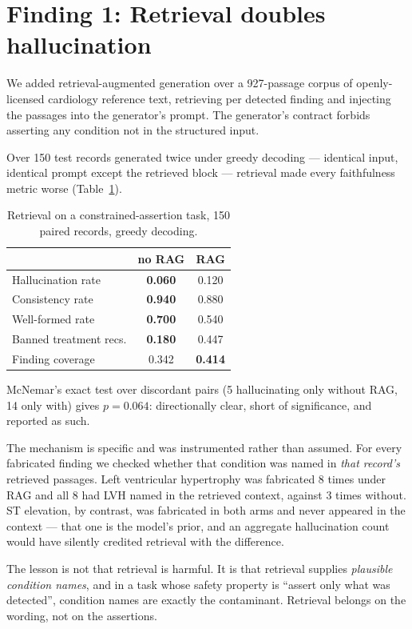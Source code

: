 \documentclass[pmlr,twocolumn,10pt]{jmlr}
\begin{document}
\section{Finding 1: Retrieval doubles hallucination}
\label{sec:rag}

We added retrieval-augmented generation \citep{lewis2020retrieval} over a 927-passage corpus
of openly-licensed cardiology reference text, retrieving per detected finding and injecting
the passages into the generator's prompt. The generator's contract forbids asserting any
condition not in the structured input.

Over 150 test records generated twice under greedy decoding --- identical input, identical
prompt except the retrieved block --- retrieval made every faithfulness metric worse
(Table~\ref{tab:rag}).

\begin{table}[t]
\centering
\caption{Retrieval on a constrained-assertion task, 150 paired records, greedy decoding.}
\label{tab:rag}
\begin{tabular}{lcc}
\toprule
 & no RAG & RAG \\
\midrule
Hallucination rate     & \textbf{0.060} & 0.120 \\
Consistency rate       & \textbf{0.940} & 0.880 \\
Well-formed rate       & \textbf{0.700} & 0.540 \\
Banned treatment recs. & \textbf{0.180} & 0.447 \\
Finding coverage       & 0.342 & \textbf{0.414} \\
\bottomrule
\end{tabular}
\end{table}

McNemar's exact test over discordant pairs (5 hallucinating only without RAG, 14 only with)
gives $p = 0.064$: directionally clear, short of significance, and reported as such.

The mechanism is specific and was instrumented rather than assumed. For every fabricated
finding we checked whether that condition was named in \emph{that record's} retrieved
passages. Left ventricular hypertrophy was fabricated 8 times under RAG and all 8 had LVH
named in the retrieved context, against 3 times without. ST elevation, by contrast, was
fabricated in both arms and never appeared in the context --- that one is the model's prior,
and an aggregate hallucination count would have silently credited retrieval with the
difference.

The lesson is not that retrieval is harmful. It is that retrieval supplies \emph{plausible
condition names}, and in a task whose safety property is ``assert only what was detected'',
condition names are exactly the contaminant. Retrieval belongs on the wording, not on the
assertions.
\end{document}
